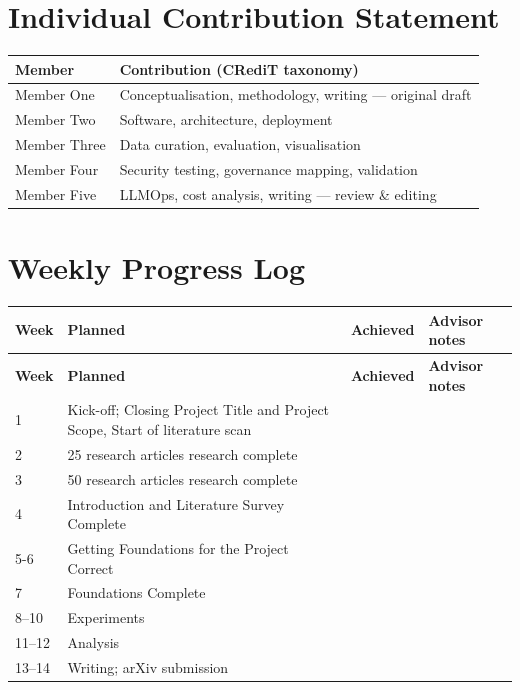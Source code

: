 \documentclass[11pt,letterpaper,oneside]{report}
\begin{document}



\appendix
\chapter{Individual Contribution Statement}
\begin{tabularx}{\textwidth}{@{}lX@{}}
\toprule
\textbf{Member} & \textbf{Contribution (CRediT taxonomy)} \\
\midrule
Member One   & Conceptualisation, methodology, writing --- original draft \\
Member Two   & Software, architecture, deployment \\
Member Three & Data curation, evaluation, visualisation \\
Member Four  & Security testing, governance mapping, validation \\
Member Five  & LLMOps, cost analysis, writing --- review \& editing \\
\bottomrule
\end{tabularx}

\chapter{Weekly Progress Log}
\begin{longtable}{@{}p{1.2cm}p{5.5cm}p{5.5cm}p{3cm}@{}}
\toprule
\textbf{Week} & \textbf{Planned} & \textbf{Achieved} & \textbf{Advisor notes} \\
\midrule
\endfirsthead
\toprule
\textbf{Week} & \textbf{Planned} & \textbf{Achieved} & \textbf{Advisor notes} \\
\midrule
\endhead
1 & Kick-off; Closing Project Title and Project Scope, Start of literature scan & & \\
2 & 25 research articles research complete & & \\
3 & 50 research articles research complete & & \\
4 & Introduction and Literature Survey Complete & & \\
5-6 & Getting Foundations for the Project Correct& & \\
7 & Foundations Complete& & \\
8--10 & Experiments & & \\
11--12 & Analysis & & \\
13--14 & Writing; arXiv submission & & \\
\bottomrule
\end{longtable}
\end{document}
